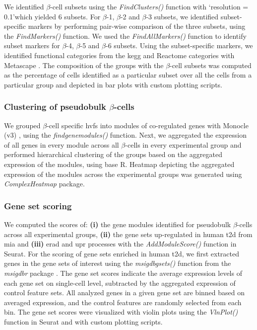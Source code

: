 \par We identified $\beta$-cell subsets using the \textit{FindClusters()} function with `resolution = 0.1'which yielded 6 subsets. For $\beta$-1, $\beta$-2 and $\beta$-3 subsets, we identified subset-specific markers by performing pair-wise comparison of the three subsets, using the \textit{FindMarkers()} function. We used the \textit{FindAllMarkers()} function to identify subset markers for $\beta$-4, $\beta$-5 and $\beta$-6 subsets. Using the subset-specific markers, we identified functional categories from the \gls{kegg} and Reactome categories with Metascape \textbf{\cite{zhou_metascape_2019}}. The composition of the groups with the $\beta$-cell subsets was computed as the percentage of cells identified as a particular subset over all the cells from a particular group and depicted in bar plots with custom plotting scripts.

\subsubsection{\large Clustering of pseudobulk $\beta$-cells}
\label{subsubsec:met_chp3_pseudo}
\par We grouped $\beta$-cell specific \glspl{hvf} into modules of co-regulated genes with Monocle (v3) \textbf{\cite{cao_single-cell_2019}}, using the \textit{find\textunderscore gene\textunderscore modules()} function. Next, we aggregated the expression of all genes in every module across all $\beta$-cells in every experimental group and performed hierarchical clustering of the groups based on the aggregated expression of the modules, using base R. Heatmap depicting the aggregated expression of the modules across the experimental groups was generated using \textit{ComplexHeatmap} package.


\subsubsection{\large Gene set scoring}
\label{subsubsec:met_chp3_scoring}
We computed the scores of: \textbf{(i)} the gene modules identified for pseudobulk $\beta$-cells across all experimental groups, \textbf{(ii)} the gene sets up-regulated in human \gls{t2d} from \gls{mia} and \textbf{(iii)} \gls{erad} and \gls{upr} processes with the \textit{AddModuleScore()} function in Seurat. For the scoring of gene sets enriched in human \gls{t2d}, we first extracted genes in the gene sets of interest using the \textit{msigdb\textunderscore gsets()} function from the \textit{msigdbr} package \textbf{\cite{igor_dolgalev_msigdbr_2022}}. The gene set scores indicate the average expression levels of each gene set on single-cell level, subtracted by the aggregated expression of control feature sets. All analyzed genes in a given gene set are binned based on averaged expression, and the control features are randomly selected from each bin. The gene set scores were visualized with violin plots using the \textit{VlnPlot()} function in Seurat and with custom plotting scripts.

